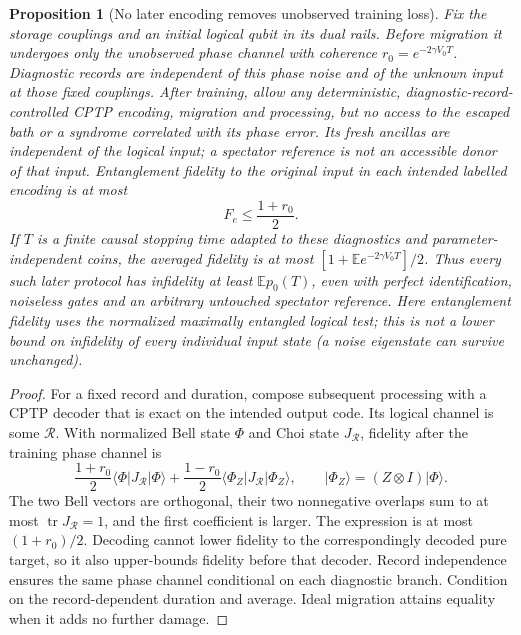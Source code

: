 \documentclass[11pt]{article}
\newtheorem{proposition}[theorem]{Proposition}
\theoremstyle{definition}
\theoremstyle{remark}
\newcommand{\E}{\mathbb E}
\begin{document}
\begin{proposition}[No later encoding removes unobserved training loss]
\label{prop:training_irreversibility}
Fix the storage couplings and an initial logical qubit in its dual
rails. Before migration it undergoes only the unobserved phase
channel with coherence $r_0=e^{-2\gamma V_0T}$.
Diagnostic records are independent of this phase noise and of
the unknown input at those fixed couplings. After training, allow
any deterministic, diagnostic-record-controlled CPTP encoding,
migration and processing, but no access to the escaped bath or a
syndrome correlated with its phase error. Its fresh ancillas are
independent of the logical input; a spectator reference is not an
accessible donor of that input. Entanglement fidelity
to the original input in each intended labelled encoding is at most
\begin{equation}\label{eq:training_irreversibility}
 F_e\le\frac{1+r_0}{2}.
\end{equation}
If $T$ is a finite causal stopping time adapted to these diagnostics
and parameter-independent coins, the averaged fidelity is at most
$[1+\E e^{-2\gamma V_0T}]/2$. Thus every such later protocol has
infidelity at least $\E p_0(T)$, even with perfect identification,
noiseless gates and an arbitrary untouched spectator reference.
Here entanglement fidelity uses the normalized maximally entangled
logical test; this is not a lower bound on infidelity of every
individual input state (a noise eigenstate can survive unchanged).
\end{proposition}
\begin{proof}
For a fixed record and duration, compose subsequent processing
with a CPTP decoder that is exact on the intended output code.
Its logical channel is some $\mathcal R$. With normalized Bell
state $\Phi$ and Choi state $J_{\mathcal R}$, fidelity after the
training phase channel is
\[
 \frac{1+r_0}{2}\langle\Phi|J_{\mathcal R}|\Phi\rangle+
 \frac{1-r_0}{2}\langle\Phi_Z|J_{\mathcal R}|\Phi_Z\rangle,
 \qquad |\Phi_Z\rangle=(Z\otimes I)|\Phi\rangle .
\]
The two Bell vectors are orthogonal, their two nonnegative
overlaps sum to at most $\operatorname{tr}J_{\mathcal R}=1$,
and the first coefficient is larger. The expression is at most
$(1+r_0)/2$. Decoding cannot lower fidelity to the correspondingly
decoded pure target, so it also upper-bounds fidelity before
that decoder. Record independence ensures the same phase
channel conditional on each diagnostic branch. Condition on
the record-dependent duration and average. Ideal migration
attains equality when it adds no further damage.
\end{proof}
\end{document}
